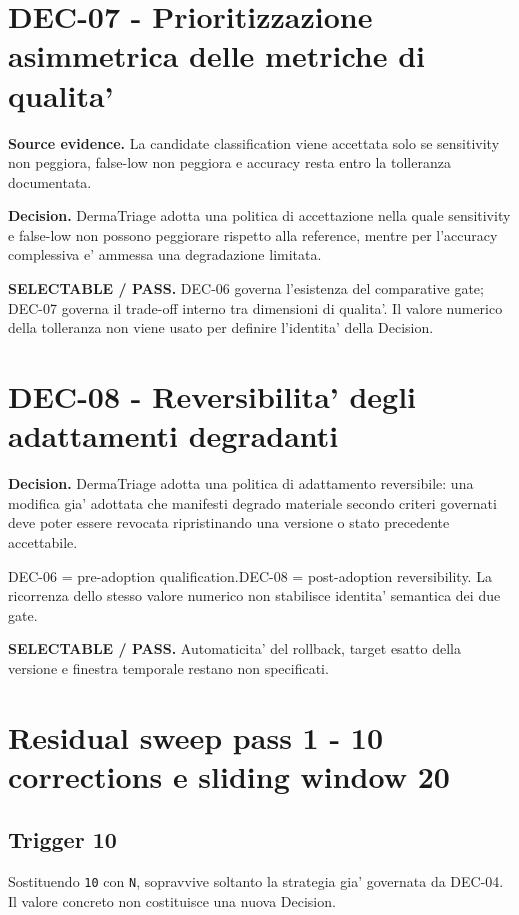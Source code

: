 \documentclass[11pt,a4paper]{article}
\begin{document}
\section{DEC-07 - Prioritizzazione asimmetrica delle metriche di qualita'}
\textbf{Source evidence.} La candidate classification viene accettata solo se sensitivity non peggiora, false-low non peggiora e accuracy resta entro la tolleranza documentata.

\textbf{Decision.} DermaTriage adotta una politica di accettazione nella quale sensitivity e false-low non possono peggiorare rispetto alla reference, mentre per l'accuracy complessiva e' ammessa una degradazione limitata.

\begin{ddtacore}[title={Disposition}]
\textbf{SELECTABLE / PASS.} DEC-06 governa l'esistenza del comparative gate; DEC-07 governa il trade-off interno tra dimensioni di qualita'. Il valore numerico della tolleranza non viene usato per definire l'identita' della Decision.
\end{ddtacore}

\section{DEC-08 - Reversibilita' degli adattamenti degradanti}
\textbf{Decision.} DermaTriage adotta una politica di adattamento reversibile: una modifica gia' adottata che manifesti degrado materiale secondo criteri governati deve poter essere revocata ripristinando una versione o stato precedente accettabile.

\begin{ddtacheck}[title={Lifecycle split}]
DEC-06 = pre-adoption qualification.\quad DEC-08 = post-adoption reversibility. La ricorrenza dello stesso valore numerico non stabilisce identita' semantica dei due gate.
\end{ddtacheck}

\begin{ddtacore}[title={Disposition}]
\textbf{SELECTABLE / PASS.} Automaticita' del rollback, target esatto della versione e finestra temporale restano non specificati.
\end{ddtacore}

\section{Residual sweep pass 1 - 10 corrections e sliding window 20}
\subsection{Trigger 10}
Sostituendo \texttt{10} con \texttt{N}, sopravvive soltanto la strategia gia' governata da DEC-04. Il valore concreto non costituisce una nuova Decision.
\end{document}

